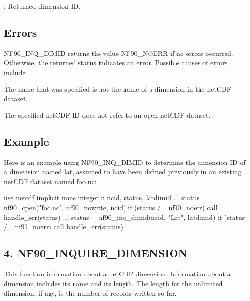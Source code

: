 \+: Returned dimension ID.

\subsection*{Errors}

N\+F90\+\_\+\+I\+N\+Q\+\_\+\+D\+I\+M\+ID returns the value N\+F90\+\_\+\+N\+O\+E\+RR if no errors occurred. Otherwise, the returned status indicates an error. Possible causes of errors include\+:


\begin{DoxyItemize}
\item The name that was specified is not the name of a dimension in the net\+C\+DF dataset.
\item The specified net\+C\+DF ID does not refer to an open net\+C\+DF dataset.
\end{DoxyItemize}

\subsection*{Example}

Here is an example using N\+F90\+\_\+\+I\+N\+Q\+\_\+\+D\+I\+M\+ID to determine the dimension ID of a dimension named lat, assumed to have been defined previously in an existing net\+C\+DF dataset named foo.\+nc\+:


\begin{DoxyCode}
\textcolor{keywordtype}{use }netcdf
\textcolor{keywordtype}{implicit none}
\textcolor{keywordtype}{integer} :: ncid, status, latdimid
...
status = nf90\_open(\textcolor{stringliteral}{"foo.nc"}, nf90\_nowrite, ncid)
\textcolor{keywordflow}{if} (status /= nf90\_noerr) \textcolor{keyword}{call }handle\_err(status)
...
status = nf90\_inq\_dimid(ncid, \textcolor{stringliteral}{"Lat"}, latdimid)
\textcolor{keywordflow}{if} (status /= nf90\_noerr) \textcolor{keyword}{call }handle\_err(status)
\end{DoxyCode}
\hypertarget{f90_dimensions_f90-nf90_inquire_dimension}{}\subsection{4. N\+F90\+\_\+\+I\+N\+Q\+U\+I\+R\+E\+\_\+\+D\+I\+M\+E\+N\+S\+I\+O\+N }\label{f90_dimensions_f90-nf90_inquire_dimension}
This function information about a net\+C\+DF dimension. Information about a dimension includes its name and its length. The length for the unlimited dimension, if any, is the number of records written so far.

